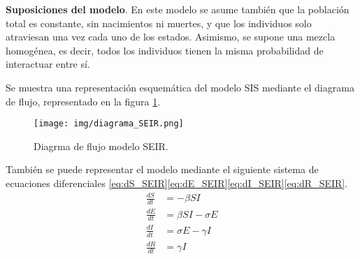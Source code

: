 \textbf{Suposiciones del modelo}. En este modelo se asume también que la población total es constante, sin nacimientos ni muertes, y que los individuos solo atraviesan una vez cada uno de los estados. Asimismo, se supone una mezcla homogénea, es decir, todos los individuos tienen la misma probabilidad de interactuar entre sí.



Se muestra una representación esquemática del modelo SIS mediante el diagrama de flujo, representado en la figura \ref{fig:diagrama SEIR}.
\begin{figure}[H]
    \centering
    \texttt{[image: img/diagrama\_SEIR.png]}
    \caption{Diagrma de flujo modelo SEIR.}
    \label{fig:diagrama SEIR}
    \vspace{0.5cm} %
\end{figure}

También se puede representar el modelo mediante el siguiente sistema de ecuaciones diferenciales \eqref{eq:dS_SEIR}\eqref{eq:dE_SEIR}\eqref{eq:dI_SEIR}\eqref{eq:dR_SEIR}. 
\begin{align}
\frac{dS}{dt} &= -\beta SI \label{eq:dS_SEIR} \\
\frac{dE}{dt} &= \beta SI - \sigma E \label{eq:dE_SEIR} \\
\frac{dI}{dt} &= \sigma E - \gamma I \label{eq:dI_SEIR} \\
\frac{dR}{dt} &= \gamma I \label{eq:dR_SEIR}
\end{align}

